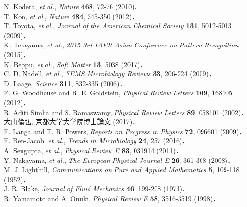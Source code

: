 \documentclass[11pt,a4j]{jarticle}
\begin{document}
\newpage
{}
\renewcommand{\refname}{参考文献}
\begin{thebibliography}{99}
N. Kodera, \textit{et al.}, \textit{Nature} \textbf{468}, 72-76 (2010)．\\
T. Kon, \textit{et al.}, \textit{Nature} \textbf{484}, 345-350 (2012)．\\
T. Toyota, \textit{et al.}, \textit{Journal of the American Chemical Society} \textbf{131}, 5012-5013 (2009)．\\
K. Terayama, \textit{et al.}, \textit{2015 3rd IAPR Asian Conference on Pattern Recognition} (2015)．\\
K. Beppu, \textit{et al.}, \textit{Soft Matter} \textbf{13}, 5038 (2017)．\\
C. D. Nadell, \textit{et al.}, \textit{FEMS Microbiology Reviews} \textbf{33}, 206-224 (2009)．\\
D. Laage, \textit{Science} \textbf{311}, 832-835 (2006)．\\
F. G. Woodhouse and R. E. Goldstein,  \textit{Physical Review Letters} \textbf{109}, 168105 (2012)．\\
R. Aditi Simha and S. Ramaswamy, \textit{Physical Review Letters} \textbf{89}, 058101 (2002)．\\
大山倫弘, 京都大学大学院博士論文 (2017)．\\
E. Lauga and T. R. Powers, \textit{Reports on Progress in Physics} \textbf{72}, 096601 (2009)．\\
E. Ben-Jacob, \textit{et al.}, \textit{Trends in Microbiology} \textbf{24}, 257 (2016)．\\
A. Sengupta, \textit{et al.}, \textit{Physical Review E} \textbf{83}, 031914 (2011)．\\
Y. Nakayama, \textit{et al.}, \textit{The European Physical Journal E} \textbf{26}, 361-368 (2008)．\\
M. J. Lighthill, \textit{Communications on Pure and Applied Mathematics} \textbf{5}, 109-118 (1952)．\\
J. R. Blake, \textit{Journal of Fluid Mechanics} \textbf{46}, 199-208 (1971)．\\
R. Yamamoto and A. Onuki, \textit{Physical Review E} \textbf{58}, 3516-3519 (1998)．\\

\end{thebibliography}
\end{document}
